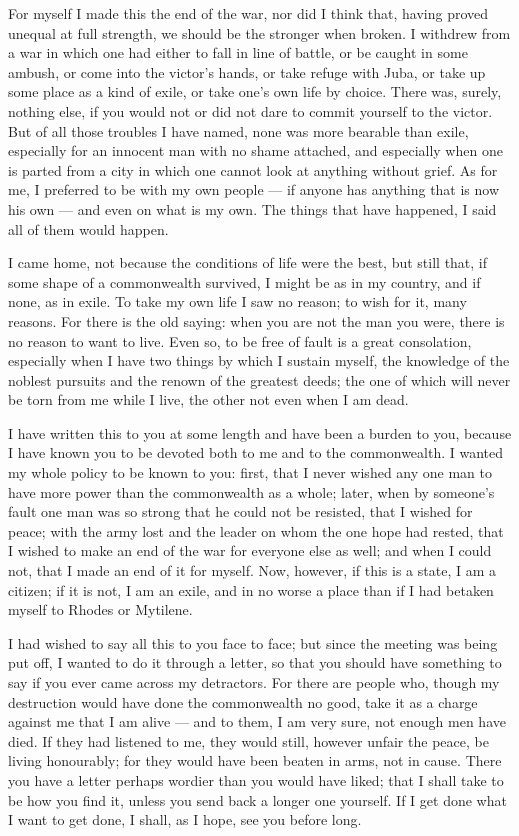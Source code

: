  For myself I made this the end of the war, nor did I think that, having proved unequal at full strength, we should be the stronger when broken. I withdrew from a war in which one had either to fall in line of battle, or be caught in some ambush, or come into the victor's hands, or take refuge with Juba, or take up some place as a kind of exile, or take one's own life by choice. There was, surely, nothing else, if you would not or did not dare to commit yourself to the victor. But of all those troubles I have named, none was more bearable than exile, especially for an innocent man with no shame attached, and especially when one is parted from a city in which one cannot look at anything without grief. As for me, I preferred to be with my own people --- if anyone has anything that is now his own --- and even on what is my own. The things that have happened, I said all of them would happen.

 I came home, not because the conditions of life were the best, but still that, if some shape of a commonwealth survived, I might be as in my country, and if none, as in exile. To take my own life I saw no reason; to wish for it, many reasons. For there is the old saying: when you are not the man you were, there is no reason to want to live. Even so, to be free of fault is a great consolation, especially when I have two things by which I sustain myself, the knowledge of the noblest pursuits and the renown of the greatest deeds; the one of which will never be torn from me while I live, the other not even when I am dead.

 I have written this to you at some length and have been a burden to you, because I have known you to be devoted both to me and to the commonwealth. I wanted my whole policy to be known to you: first, that I never wished any one man to have more power than the commonwealth as a whole; later, when by someone's fault one man was so strong that he could not be resisted, that I wished for peace; with the army lost and the leader on whom the one hope had rested, that I wished to make an end of the war for everyone else as well; and when I could not, that I made an end of it for myself. Now, however, if this is a state, I am a citizen; if it is not, I am an exile, and in no worse a place than if I had betaken myself to Rhodes or Mytilene.

 I had wished to say all this to you face to face; but since the meeting was being put off, I wanted to do it through a letter, so that you should have something to say if you ever came across my detractors. For there are people who, though my destruction would have done the commonwealth no good, take it as a charge against me that I am alive --- and to them, I am very sure, not enough men have died. If they had listened to me, they would still, however unfair the peace, be living honourably; for they would have been beaten in arms, not in cause. There you have a letter perhaps wordier than you would have liked; that I shall take to be how you find it, unless you send back a longer one yourself. If I get done what I want to get done, I shall, as I hope, see you before long.
